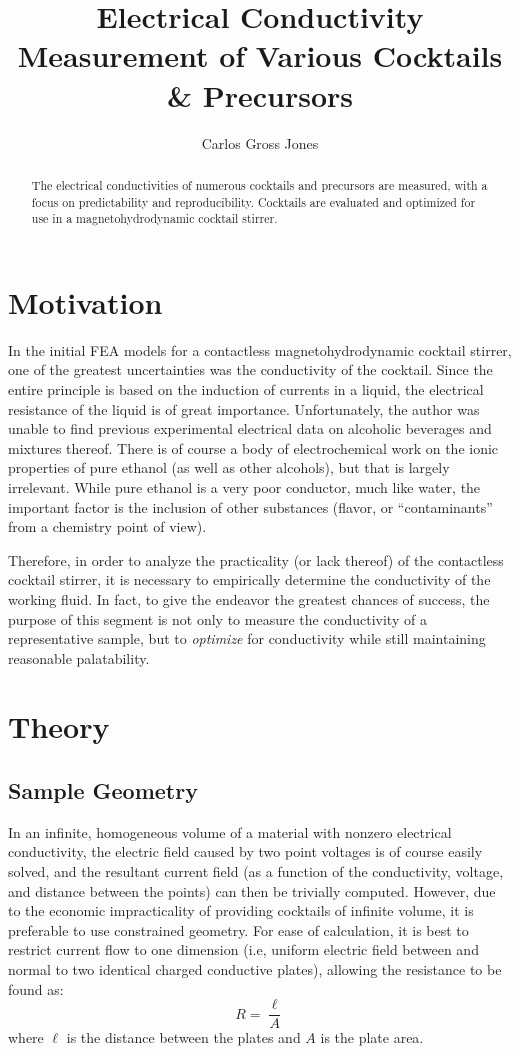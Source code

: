 \documentclass[]{article}
\title{Electrical Conductivity Measurement of Various Cocktails \& Precursors}
\author{Carlos Gross Jones}
\begin{document}
\maketitle

\begin{abstract}
The electrical conductivities of numerous cocktails and precursors are measured, with a focus on predictability and reproducibility. Cocktails are evaluated and optimized for use in a magnetohydrodynamic cocktail stirrer. 
\end{abstract}

\section{Motivation}
\par In the initial FEA models for a contactless magnetohydrodynamic cocktail stirrer, one of the greatest uncertainties was the conductivity of the cocktail. Since the entire principle is based on the induction of currents in a liquid, the electrical resistance of the liquid is of great importance. Unfortunately, the author was unable to find previous experimental electrical data on alcoholic beverages and mixtures thereof. There is of course a body of electrochemical work on the ionic properties of pure ethanol (as well as other alcohols), but that is largely irrelevant. While pure ethanol is a very poor conductor, much like water, the important factor is the inclusion of other substances (flavor, or ``contaminants'' from a chemistry point of view).
\par Therefore, in order to analyze the practicality (or lack thereof) of the contactless cocktail stirrer, it is necessary to empirically determine the conductivity of the working fluid. In fact, to give the endeavor the greatest chances of success, the purpose of this segment is not only to measure the conductivity of a representative sample, but to \textit{optimize} for conductivity while still maintaining reasonable palatability.
\section{Theory}
\subsection{Sample Geometry}
\par In an infinite, homogeneous volume of a material with nonzero electrical conductivity, the electric field caused by two point voltages is of course easily solved, and the resultant current field (as a function of the conductivity, voltage, and distance between the points) can then be trivially computed. However, due to the economic impracticality of providing cocktails of infinite volume, it is preferable to use constrained geometry. For ease of calculation, it is best to restrict current flow to one dimension (i.e, uniform electric field between and normal to two identical charged conductive plates), allowing the resistance to be found as:
\begin{equation}
R=\frac{\ell}{A}
\end{equation}
where $\ell$ is the distance between the plates and $A$ is the plate area.
\end{document}
